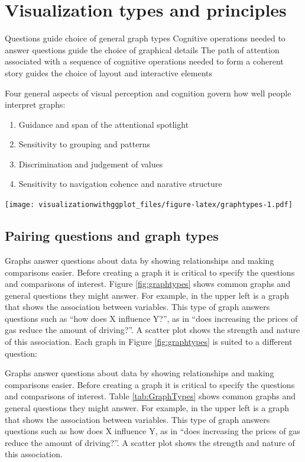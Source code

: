 \documentclass[]{krantz}
\providecommand{\tightlist}{%
  \setlength{\itemsep}{0pt}\setlength{\parskip}{0pt}}
\begin{document}
\hypertarget{Principles}{%
\chapter{Visualization types and principles}\label{Principles}}

Questions guide choice of general graph types
Cognitive operations needed to answer questions guide the choice of graphical details
The path of attention associated with a sequence of cognitive operations needed to form a coherent story guides the choice of layout and interactive elements

Four general aspects of visual perception and cognition govern how well people interpret graphs:

\begin{enumerate}
\def\labelenumi{\arabic{enumi}.}
\tightlist
\item
  Guidance and span of the attentional spotlight
\item
  Sensitivity to grouping and patterns
\item
  Discrimination and judgement of values
\item
  Sensitivity to navigation cohence and narative structure
\end{enumerate}

\texttt{[image: visualizationwithggplot\_files/figure-latex/graphtypes-1.pdf]}

\hypertarget{pairing-questions-and-graph-types}{%
\section{Pairing questions and graph types}\label{pairing-questions-and-graph-types}}

Graphs answer questions about data by showing relationships and making comparisons easier. Before creating a graph it is critical to specify the questions and comparisons of interest. Figure \ref{fig:graphtypes} shows common graphs and general questions they might answer. For example, in the upper left is a graph that shows the association between variables. This type of graph answers questions such as ``how does X influence Y?'', as in ``does increasing the prices of gas reduce the amount of driving?''. A scatter plot shows the strength and nature of this association. Each graph in Figure \ref{fig:graphtypes} is suited to a different question:

Graphs answer questions about data by showing relationships and making comparisons easier. Before creating a graph it is critical to specify the questions and comparisons of interest. Table \ref{tab:GraphTypes} shows common graphs and general questions they might answer. For example, in the upper left is a graph that shows the association between variables. This type of graph answers questions such as how does X influence Y, as in ``does increasing the prices of gas reduce the amount of driving?''. A scatter plot shows the strength and nature of this association.
\end{document}

